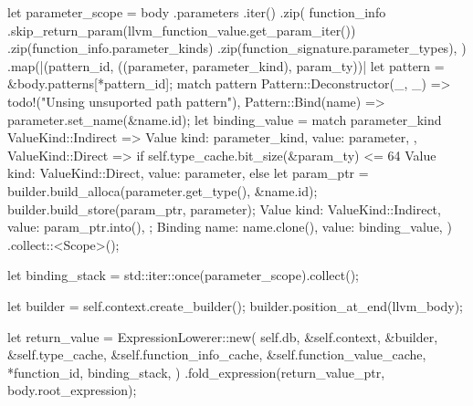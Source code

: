 \documentclass[
  oneside,
  english,
  coorientadorbanca,
  noabntexcite
]{ufsc-thesis-rn46-2019}
\begin{document}
\begin{rustcode}
{{        let parameter_scope = body
            .parameters
            .iter()
            .zip(
                function_info
                    .skip_return_param(llvm_function_value.get_param_iter())
                    .zip(function_info.parameter_kinds)
                    .zip(function_signature.parameter_types),
            )
            .map(|(pattern_id, ((parameter, parameter_kind), param_ty))| {
                let pattern = &body.patterns[*pattern_id];
                match pattern {
                    Pattern::Deconstructor(_, _) => todo!("Unsing unsuported path pattern"),
                    Pattern::Bind(name) => {
                        parameter.set_name(&name.id);
                        let binding_value = match parameter_kind {
                            ValueKind::Indirect => Value {
                                kind: parameter_kind,
                                value: parameter,
                            },
                            ValueKind::Direct => {
                                if self.type_cache.bit_size(&param_ty) <= 64 {
                                    Value {
                                        kind: ValueKind::Direct,
                                        value: parameter,
                                    }
                                } else {
                                    let param_ptr =
                                        builder.build_alloca(parameter.get_type(), &name.id);
                                    builder.build_store(param_ptr, parameter);
                                    Value {
                                        kind: ValueKind::Indirect,
                                        value: param_ptr.into(),
                                    }
                                }
                            }
                        };
                        Binding {
                            name: name.clone(),
                            value: binding_value,
                        }
                    }
                }
            })
            .collect::<Scope>();

        let binding_stack = std::iter::once(parameter_scope).collect();

        let builder = self.context.create_builder();
        builder.position_at_end(llvm_body);

        let return_value = ExpressionLowerer::new(
            self.db,
            &self.context,
            &builder,
            &self.type_cache,
            &self.function_info_cache,
            &self.function_value_cache,
            *function_id,
            binding_stack,
        )
        .fold_expression(return_value_ptr, body.root_expression);

}}
\end{rustcode}
\end{document}
